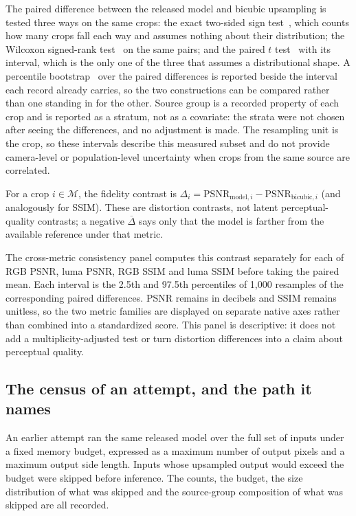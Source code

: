 The paired difference between the released model and bicubic upsampling is
tested three ways on the same \SubsetN{} crops: the exact two-sided sign
test~\cite{dixon1946sign}, which counts how many crops fall each way and assumes
nothing about their distribution; the Wilcoxon signed-rank
test~\cite{wilcoxon1945individual} on the same pairs; and the paired $t$
test~\cite{student1908probable} with its interval, which is the only one of the
three that assumes a distributional shape. A percentile
bootstrap~\cite{efron1979bootstrap} over the paired differences is reported
beside the interval each record already carries, so the two constructions can be
compared rather than one standing in for the other. Source group is a recorded
property of each crop and is reported as a stratum, not as a covariate: the
strata were not chosen after seeing the differences, and no adjustment is made.
The resampling unit is the crop, so these intervals describe this measured
subset and do not provide camera-level or population-level uncertainty when
crops from the same source are correlated.

For a crop \(i\in\mathcal{M}\), the fidelity contrast is
\(\Delta_i=\mathrm{PSNR}_{\mathrm{model},i}
-\mathrm{PSNR}_{\mathrm{bicubic},i}\) (and analogously for SSIM). These are
distortion contrasts, not latent perceptual-quality contrasts; a negative
\(\overline{\Delta}\) says only that the model is farther from the available
reference under that metric.

The cross-metric consistency panel computes this contrast separately for each
of RGB PSNR, luma PSNR, RGB SSIM and luma SSIM before taking the paired mean.
Each interval is the 2.5th and 97.5th percentiles of 1,000 resamples of the
corresponding paired differences. PSNR remains in decibels and SSIM remains
unitless, so the two metric families are displayed on separate native axes
rather than combined into a standardized score. This panel is descriptive: it
does not add a multiplicity-adjusted test or turn distortion differences into a
claim about perceptual quality.

\subsection{The census of an attempt, and the path it names}

An earlier attempt ran the same released model over the full set of
\CensusTotal{} inputs under a fixed memory budget, expressed as a maximum number
of output pixels and a maximum output side length. Inputs whose upsampled output
would exceed the budget were skipped before inference. The counts, the budget,
the size distribution of what was skipped and the source-group composition of
what was skipped are all recorded.

